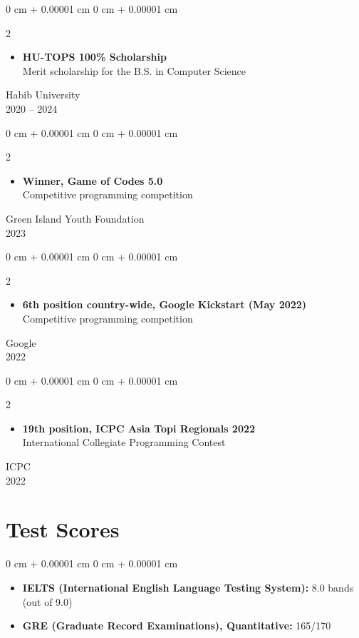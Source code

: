 \documentclass[10pt, letterpaper]{article}
\newenvironment{highlights}{
    \begin{itemize}[
        topsep=0.10 cm,
        parsep=0.10 cm,
        partopsep=0pt,
        itemsep=0pt,
        leftmargin=0 cm + 10pt
    ]
}{
    \end{itemize}
} %
\newenvironment{highlightsforbulletentries}{
    \begin{itemize}[
        topsep=0.10 cm,
        parsep=0.10 cm,
        partopsep=0pt,
        itemsep=0pt,
        leftmargin=10pt
    ]
}{
    \end{itemize}
}
\newenvironment{onecolentry}{
    \begin{adjustwidth}{
        0 cm + 0.00001 cm
    }{
        0 cm + 0.00001 cm
    }
}{
    \end{adjustwidth}
} %
\newenvironment{twocolentry}[2][]{
    \onecolentry
    \def\secondColumn{#2}
    \setcolumnwidth{\fill, 4.5 cm}
    \begin{paracol}{2}
}{
    \switchcolumn \raggedleft \secondColumn
    \end{paracol}
    \endonecolentry
} %
\begin{document}
\begin{twocolentry}{Habib University \\ 2020 -- 2024}
    \begin{highlightsforbulletentries}
        \item \textbf{HU-TOPS 100\% Scholarship} \\
        Merit scholarship for the B.S. in Computer Science
    \end{highlightsforbulletentries}
\end{twocolentry}

\vspace{0.2 cm}

\begin{twocolentry}{Green Island Youth Foundation \\ 2023}
    \begin{highlightsforbulletentries}
        \item \textbf{Winner, Game of Codes 5.0} \\
        Competitive programming competition
    \end{highlightsforbulletentries}
\end{twocolentry}

\vspace{0.2 cm}

\begin{twocolentry}{Google \\ 2022}
    \begin{highlightsforbulletentries}
        \item \textbf{6th position country-wide, Google Kickstart (May 2022)} \\
        Competitive programming competition
    \end{highlightsforbulletentries}
\end{twocolentry}

\vspace{0.2 cm}

\begin{twocolentry}{ICPC \\ 2022}
    \begin{highlightsforbulletentries}
        \item \textbf{19th position, ICPC Asia Topi Regionals 2022} \\
        International Collegiate Programming Contest
    \end{highlightsforbulletentries}
\end{twocolentry}

\section{Test Scores}
\begin{onecolentry}
    \begin{highlights}
        \item \textbf{IELTS (International English Language Testing System):} 8.0 bands (out of 9.0)
        \item \textbf{GRE (Graduate Record Examinations), Quantitative:} 165/170
    \end{highlights}
\end{onecolentry}
\end{document}
